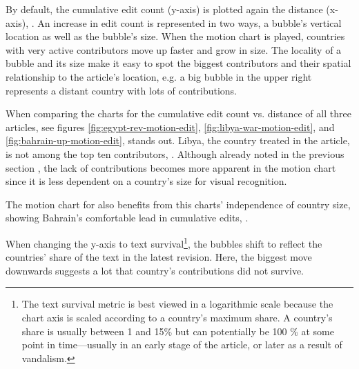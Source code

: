 
By default, the cumulative edit count (y-axis) is plotted again the distance (x-axis), .
An increase in edit count is represented in two ways, a bubble's vertical location as well as the bubble's size.
When the motion chart is played, countries with very active contributors move up faster and grow in size. 
The locality of a bubble and its size make it easy to spot the biggest contributors and their spatial relationship to the article's location, e.g. a big bubble in the upper right represents a distant country with lots of contributions. 


When comparing the charts for the cumulative edit count vs. distance of all three articles, see figures \ref{fig:egypt-rev-motion-edit}, \ref{fig:libya-war-motion-edit}, and \ref{fig:bahrain-up-motion-edit},  stands out.
Libya, the country treated in the article, is not among the top ten contributors, .
Although already noted in the previous section , the lack of contributions becomes more apparent in the motion chart since it is less dependent on a country's size for visual recognition.

The motion chart for  also benefits from this charts' independence of country size, showing Bahrain's comfortable lead in cumulative edits, .


When changing the y-axis to text survival\footnote{The text survival metric is best viewed in a logarithmic scale because the chart axis is scaled according to a country's maximum share. A country's share is usually between 1 and 15\% but  can potentially be 100 \% at some point in time---usually in an early stage of the article, or later as a result of vandalism.}, the bubbles shift to reflect the countries' share of the text in the latest revision.
Here, the biggest move downwards suggests a lot that country's contributions did not survive.


